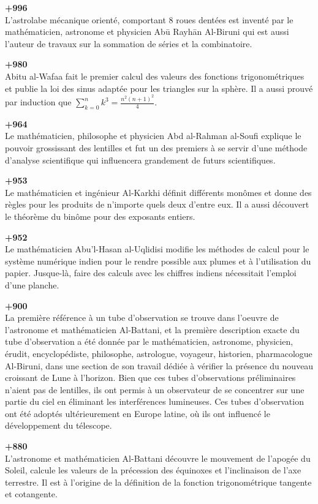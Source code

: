 \textbf{+996}\\
L'astrolabe mécanique orienté, comportant 8 roues dentées est inventé par le mathématicien, astronome et physicien Abū Rayhān Al-Biruni qui est aussi l'auteur de travaux sur la sommation de séries et la combinatoire.

\textbf{+980}\\
Abitu al-Wafaa fait le premier calcul des valeurs des fonctions trigonométriques et publie la loi des sinus adaptée pour les triangles sur la sphère. Il a aussi prouvé par induction que $\sum_{k=0}^n k^3=\frac{n^2(n+1)^2}{4}$.

\textbf{+964}\\
Le mathématicien, philosophe et physicien Abd al-Rahman al-Soufi explique le pouvoir grossissant des lentilles et fut un des premiers à se servir d'une méthode d'analyse scientifique qui influencera grandement de futurs scientifiques.

\textbf{+953}\\
Le mathématicien et ingénieur Al-Karkhi définit différents monômes et donne des règles pour les produits de n'importe quels deux d'entre eux. Il a aussi découvert le théorème du binôme pour des exposants entiers.

\textbf{+952}\\
Le mathématicien Abu'l-Hasan al-Uqlidisi modifie les méthodes de calcul pour le système numérique indien pour le rendre possible aux plumes et à l'utilisation du papier. Jusque-là, faire des calculs avec les chiffres indiens nécessitait l'emploi d'une planche.

\textbf{+900}\\
La première référence à un tube d'observation se trouve dans l'oeuvre de l'astronome et mathématicien Al-Battani, et la première description exacte du tube d'observation a été donnée par le mathématicien, astronome, physicien, érudit, encyclopédiste, philosophe, astrologue, voyageur, historien, pharmacologue Al-Biruni, dans une section de son travail  dédiée à vérifier la présence du nouveau croissant de Lune à l'horizon. Bien que ces tubes d'observations préliminaires n'aient pas de lentilles, ils ont permis à un observateur de se concentrer sur une partie du ciel en éliminant les interférences lumineuses. Ces tubes d'observation ont été adoptés ultérieurement en Europe latine, où ils ont influencé le développement du télescope.

\textbf{+880}\\
L'astronome et mathématicien Al-Battani découvre le mouvement de l'apogée du Soleil, calcule les valeurs de la précession des équinoxes et l'inclinaison de l'axe terrestre. Il est à l'origine de la définition de la fonction trigonométrique tangente et cotangente.

